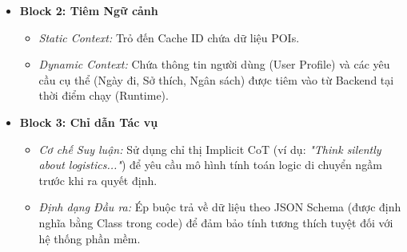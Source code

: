 \begin{itemize}
\begin{itemize}
        \item \textbf{Block 2: Tiêm Ngữ cảnh}
        \begin{itemize}
            \item \textit{Static Context:} Trỏ đến Cache ID chứa dữ liệu POIs.
            \item \textit{Dynamic Context:} Chứa thông tin người dùng (User Profile) và các yêu cầu cụ thể (Ngày đi, Sở thích, Ngân sách) được tiêm vào từ Backend tại thời điểm chạy (Runtime).
        \end{itemize}
        
        \item \textbf{Block 3: Chỉ dẫn Tác vụ}
        \begin{itemize}
            \item \textit{Cơ chế Suy luận:} Sử dụng chỉ thị Implicit CoT (ví dụ: \textit{"Think silently about logistics..."}) để yêu cầu mô hình tính toán logic di chuyển ngầm trước khi ra quyết định.
            \item \textit{Định dạng Đầu ra:} Ép buộc trả về dữ liệu theo JSON Schema (được định nghĩa bằng Class trong code) để đảm bảo tính tương thích tuyệt đối với hệ thống phần mềm.
        \end{itemize}
    \end{itemize}
\end{itemize}


